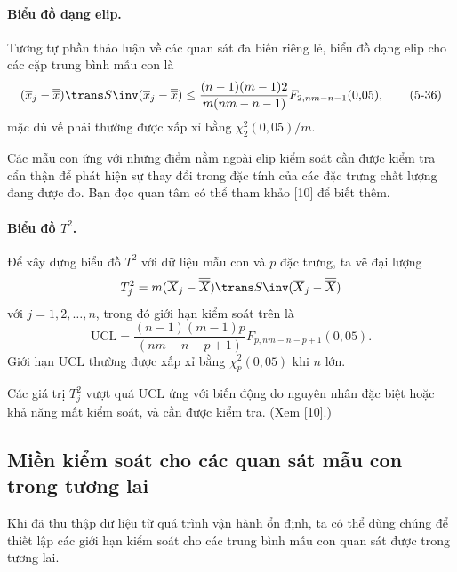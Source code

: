 \paragraph{Biểu đồ dạng elip.} Tương tự phần thảo luận về các quan sát đa biến riêng lẻ, biểu đồ dạng elip cho các cặp trung bình mẫu con là
\begin{equation}
    (\overline{x}_{j}-\overline{\overline{x}})\trans S\inv(\overline{x}_{j}-\overline{\overline{x}}) \le \frac{(n-1)(m-1)2}{m(nm-n-1)}F_{2, nm-n-1}(0{,}05),
    \tag{5-36}
    \label{eq:5-36}
\end{equation}
mặc dù vế phải thường được xấp xỉ bằng $\chi_{2}^{2}(0{,}05)/m$.

Các mẫu con ứng với những điểm nằm ngoài elip kiểm soát cần được kiểm tra cẩn thận để phát hiện sự thay đổi trong đặc tính của các đặc trưng chất lượng đang được đo. Bạn đọc quan tâm có thể tham khảo [10] để biết thêm.

\paragraph{Biểu đồ $T^{2}$.} Để xây dựng biểu đồ $T^{2}$ với dữ liệu mẫu con và $p$ đặc trưng, ta vẽ đại lượng
\begin{equation*}
    T_{j}^{2} = m(\overline{X}_{j}-\overline{\overline{X}})\trans S\inv(\overline{X}_{j}-\overline{\overline{X}})
\end{equation*}
với $j=1,2,\dots,n$, trong đó giới hạn kiểm soát trên là
\begin{equation*}
    \mathrm{UCL} = \frac{(n-1)(m-1)p}{(nm-n-p+1)}F_{p, nm-n-p+1}(0{,}05).
\end{equation*}
Giới hạn $\mathrm{UCL}$ thường được xấp xỉ bằng $\chi_{p}^{2}(0{,}05)$ khi $n$ lớn.

Các giá trị $T_{j}^{2}$ vượt quá $\mathrm{UCL}$ ứng với biến động do nguyên nhân đặc biệt hoặc khả năng mất kiểm soát, và cần được kiểm tra. (Xem [10].)

\subsection*{\textbf{Miền kiểm soát cho các quan sát mẫu con trong tương lai}}

Khi đã thu thập dữ liệu từ quá trình vận hành ổn định, ta có thể dùng chúng để thiết lập các giới hạn kiểm soát cho các trung bình mẫu con quan sát được trong tương lai.

